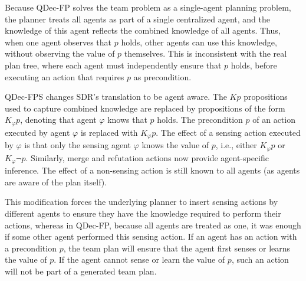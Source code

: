 \documentclass[letterpaper]{article} %
\newcommand\commentout[1]{}
\theoremstyle{definition}
\begin{document}
\commentout{ \guy{Commenting out the below, because it is relevant for the discussion of soundness and completeness, not agent specific knowledge}
If the agent models all possible states of the world, this mechanism is sound, that is, if the planner concludes that $Kp$ holds, then $p$ holds in the current belief state. It is also complete w.r.t.~literals and their conjunction. That is, if $Kp$ holds, the planner can deduce this fact using its inference actions.

Reasoning about the explicit set of possible worlds, which is often exponential, is impractical. Therefore, SDR sub-samples the set of possible worlds, and hence its reasoning is complete, but unsound. CPOR then fixes
this issue by performing regression before inserting any action into its plan, to verify that its preconditions hold in all possible worlds. Because regression is complete, this ensures the overall soundness of the planner. 
}

Because QDec-FP solves the team problem as a single-agent planning problem, the planner treats all agents as part of a single centralized agent, and the knowledge of this agent reflects the combined knowledge of all agents. Thus, when one agent observes that $p$ holds, other agents can use this knowledge, without observing the value of $p$ themselves. This is inconsistent with the real plan tree, where each agent must independently ensure that $p$ holds, before executing an action that requires $p$ as precondition.

QDec-FPS changes SDR's translation to be agent aware. 
The $Kp$ propositions used to capture combined knowledge
are replaced by propositions of the form $K_{\varphi}p$, denoting that agent $\varphi$ knows that $p$ holds. The precondition $p$ of an action executed by agent $\varphi$ is replaced with  $K_{\varphi}p$. The effect of a sensing action executed by $\varphi$ is that only the sensing agent $\varphi$ knows the value of $p$, i.e., either $K_{\varphi}p$ or $K_{\varphi}\neg p$. 
Similarly, merge and refutation actions now provide  agent-specific inference. The effect of a non-sensing action is still known to all agents (as agents are aware of the plan itself).

This modification forces the underlying planner to insert sensing actions by different agents to ensure they have the knowledge required to perform their actions, whereas in QDec-FP, because all agents are treated as one, it was enough if some other agent performed this sensing action. If an agent has an action with a precondition $p$, the team plan will ensure that the agent first senses or learns the value of $p$.
If the agent cannot sense or learn the value of $p$, such an action will not be part of a generated team plan.
\end{document}
